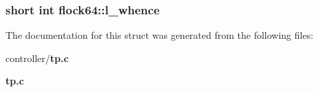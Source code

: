 \subsubsection[{l\_\-whence}]{\setlength{\rightskip}{0pt plus 5cm}short int {\bf flock64::l\_\-whence}}\label{structflock64_a178c8591cf7f180c881265b378d8ec7e}


The documentation for this struct was generated from the following files:\begin{DoxyCompactItemize}
\item 
controller/{\bf tp.c}\item 
{\bf tp.c}\end{DoxyCompactItemize}

